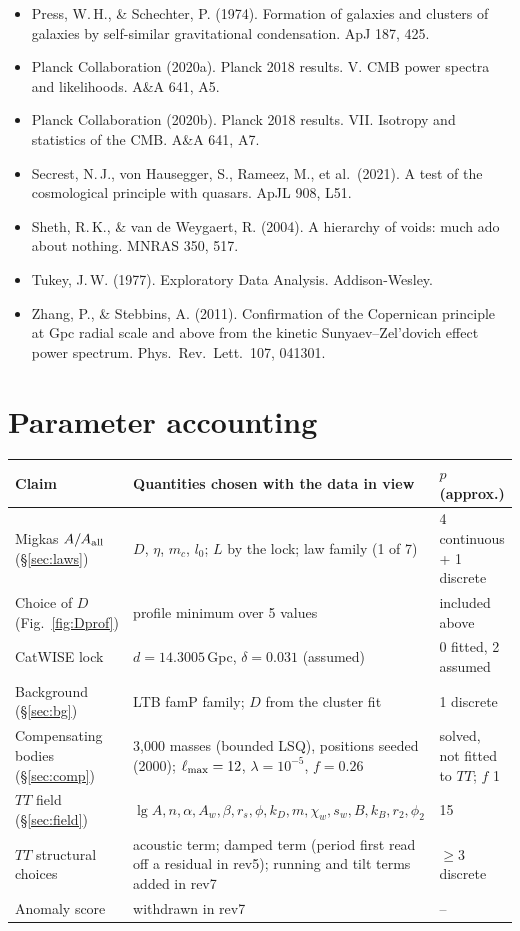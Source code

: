\documentclass[11pt]{article}
\begin{document}
\begin{itemize}
\item Press, W.\,H., \& Schechter, P. (1974). Formation of galaxies and clusters of galaxies by self-similar gravitational condensation. ApJ 187, 425.
\item Planck Collaboration (2020a). Planck 2018 results. V. CMB power spectra and likelihoods. A\&A 641, A5.
\item Planck Collaboration (2020b). Planck 2018 results. VII. Isotropy and statistics of the CMB. A\&A 641, A7.
\item Secrest, N.\,J., von Hausegger, S., Rameez, M., et al.\ (2021). A test of the cosmological principle with quasars. ApJL 908, L51.
\item Sheth, R.\,K., \& van de Weygaert, R. (2004). A hierarchy of voids: much ado about nothing. MNRAS 350, 517.
\item Tukey, J.\,W. (1977). Exploratory Data Analysis. Addison-Wesley.
\item Zhang, P., \& Stebbins, A. (2011). Confirmation of the Copernican principle at Gpc radial scale and above from the kinetic Sunyaev--Zel'dovich effect power spectrum. Phys.\ Rev.\ Lett.\ 107, 041301.
\end{itemize}
\normalsize
\appendix
\section{Parameter accounting}
\begin{table}[H]\centering\small
\begin{tabular}{@{}p{4.2cm}p{7.4cm}p{3.2cm}@{}}\toprule
Claim & Quantities chosen with the data in view & $p$ (approx.)\\\midrule
Migkas $A/A_{\rm all}$ (\S\ref{sec:laws}) & $D$, $\eta$, $m_c$, $l_0$; $L$ by the lock; law family (1 of 7) & 4 continuous + 1 discrete\\
Choice of $D$ (Fig.~\ref{fig:Dprof}) & profile minimum over 5 values & included above\\
CatWISE lock & $d=14.3005$\,Gpc, $\delta=0.031$ (assumed) & 0 fitted, 2 assumed\\
Background (\S\ref{sec:bg}) & LTB famP family; $D$ from the cluster fit & 1 discrete\\
Compensating bodies (\S\ref{sec:comp}) & 3,000 masses (bounded LSQ), positions seeded (2000); $\ell_{\rm max}=12$, $\lambda=10^{-5}$, $f=0.26$ & solved, not fitted to $TT$; $f$ 1\\
$TT$ field (\S\ref{sec:field}) & $\lg A,n,\alpha,A_w,\beta,r_s,\phi,k_D,m,\chi_w,s_w,B,k_B,r_2,\phi_2$ & 15\\
$TT$ structural choices & acoustic term; damped term (period first read off a residual in rev5); running and tilt terms added in rev7 & $\ge3$ discrete\\
Anomaly score & withdrawn in rev7 & --\\\bottomrule
\end{tabular}\end{table}
\end{document}
